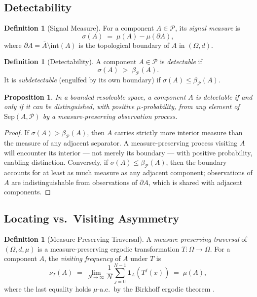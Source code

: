 \documentclass[12pt,a4paper,twocolumn]{article}
\theoremstyle{plain}
\newtheorem{proposition}[theorem]{Proposition}
\theoremstyle{definition}
\newtheorem{definition}[theorem]{Definition}
\theoremstyle{remark}
\newcommand{\Part}{\mathcal{P}}
\newcommand{\Sep}{\mathrm{Sep}}
\newcommand{\bP}{\beta_{\mathcal{P}}}
\newcommand{\BRS}{(\Omega,d,\mu)}
\begin{document}
\subsection{Detectability}

\begin{definition}[Signal Measure]
\label{def:signal}
For a component $A \in \Part$, its \emph{signal measure} is
\begin{equation}
  \sigma(A) \;=\; \mu(A) - \mu(\partial A),
\end{equation}
where $\partial A = \overline{A} \setminus \mathrm{int}(A)$ is the topological
boundary of $A$ in $(\Omega, d)$.
\end{definition}

\begin{definition}[Detectability]
\label{def:detectability}
A component $A \in \Part$ is \emph{detectable} if
\begin{equation}
  \sigma(A) \;>\; \bP(A).
\end{equation}
It is \emph{subdetectable} (engulfed by its own boundary) if
$\sigma(A) \leq \bP(A)$.
\end{definition}

\begin{proposition}
In a bounded resolvable space, a component $A$ is detectable if and only if
it can be distinguished, with positive $\mu$-probability, from any element
of $\Sep(A,\Part)$ by a measure-preserving observation process.
\end{proposition}

\begin{proof}
If $\sigma(A) > \bP(A)$, then $A$ carries strictly more interior measure
than the measure of any adjacent separator.  A measure-preserving process
visiting $A$ will encounter its interior --- not merely its boundary --- with
positive probability, enabling distinction.  Conversely, if $\sigma(A) \leq
\bP(A)$, then the boundary accounts for at least as much measure as any
adjacent component; observations of $A$ are indistinguishable from
observations of $\partial A$, which is shared with adjacent components.
\end{proof}

\subsection{Locating vs.\ Visiting Asymmetry}

\begin{definition}[Measure-Preserving Traversal]
\label{def:traversal}
A \emph{measure-preserving traversal} of $\BRS$ is a measure-preserving
ergodic transformation $T : \Omega \to \Omega$.  For a component $A$,
the \emph{visiting frequency} of $A$ under $T$ is
\begin{equation}
  \nu_T(A) \;=\; \lim_{N\to\infty} \frac{1}{N} \sum_{j=0}^{N-1}
    \mathbf{1}_A\!\left(T^j(x)\right) \;=\; \mu(A),
\end{equation}
where the last equality holds $\mu$-a.e.\ by the Birkhoff ergodic theorem
\citep{halmos1950measure}.
\end{definition}
\end{document}
